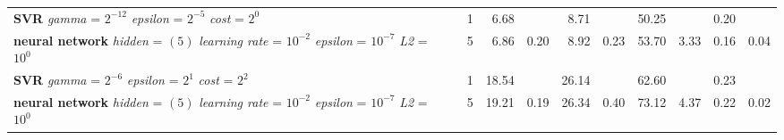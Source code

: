 \begin{table}[ht]
\begin{tabular}{lllrrrrrrrrr}
  \makecell[tl]{\textbf{SVR}\\ \textit{gamma} = $2^{-12}$ \\ \textit{epsilon} = $2^{-5}$ \\ \textit{cost} = $2^{0}$} & \cellcolor[HTML]{FFFF88}{summer} & \cellcolor[HTML]{EADAFF}{seasonal} &   1 & 6.68 &  & 8.71 &  & 50.25 &  & 0.20 &  \\ 
  \makecell[tl]{\textbf{neural network}\\ \textit{hidden} = $(5)$ \\ \textit{learning rate} = $10^{-2}$ \\ \textit{epsilon} = $10^{-7}$ \\ \textit{L2} = $10^{0}$} & \cellcolor[HTML]{FFFF88}{summer} & \cellcolor[HTML]{EADAFF}{seasonal} &   5 & 6.86 & 0.20 & 8.92 & 0.23 & 53.70 & 3.33 & 0.16 & 0.04 \\ 
  \makecell[tl]{\textbf{SVR}\\ \textit{gamma} = $2^{-6}$ \\ \textit{epsilon} = $2^{1}$ \\ \textit{cost} = $2^{2}$} & \cellcolor[HTML]{FFAA88}{autumn} & \cellcolor[HTML]{FFFFFF}{all} &   1 & 18.54 &  & 26.14 &  & 62.60 &  & 0.23 &  \\ 
  \makecell[tl]{\textbf{neural network}\\ \textit{hidden} = $(5)$ \\ \textit{learning rate} = $10^{-2}$ \\ \textit{epsilon} = $10^{-7}$ \\ \textit{L2} = $10^{0}$} & \cellcolor[HTML]{FFAA88}{autumn} & \cellcolor[HTML]{FFFFFF}{all} &   5 & 19.21 & 0.19 & 26.34 & 0.40 & 73.12 & 4.37 & 0.22 & 0.02 \\ 
   \bottomrule
\end{tabular}
\endgroup
\end{table}
